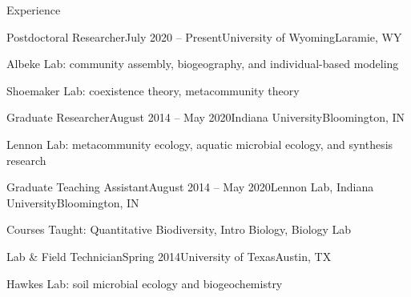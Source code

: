 \documentclass{resume} %
\begin{document}
\begin{rSection}{Experience}

\begin{rSubsection}{Postdoctoral Researcher}{July 2020 -- Present}{University of Wyoming}{Laramie, WY}
\item Albeke Lab: community assembly, biogeography, and individual-based modeling 
\item Shoemaker Lab: coexistence theory, metacommunity theory
\end{rSubsection}

\begin{rSubsection}{Graduate Researcher}{August 2014 -- May 2020}{Indiana University}{Bloomington, IN}
\item Lennon Lab: metacommunity ecology, aquatic microbial ecology, and synthesis research
\end{rSubsection}

\begin{rSubsection}{Graduate Teaching Assistant}{August 2014 -- May 2020}{Lennon Lab, Indiana University}{Bloomington, IN}
\item Courses Taught: Quantitative Biodiversity, Intro Biology, Biology Lab
\end{rSubsection}

\begin{rSubsection}{Lab \& Field Technician}{Spring 2014}{University of Texas}{Austin, TX}
\item Hawkes Lab: soil microbial ecology and biogeochemistry
\end{rSubsection}

\end{rSection}
\bigskip
\end{document}
